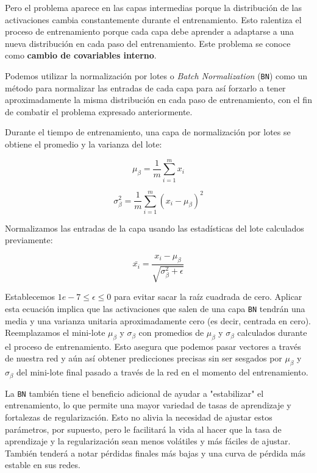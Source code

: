\documentclass[a4paper,12pt]{article}
\begin{document}
Pero el problema aparece en las capas intermedias porque la distribución de las activaciones cambia constantemente durante el entrenamiento. Esto ralentiza el proceso de entrenamiento porque cada capa debe aprender a adaptarse a una nueva distribución en cada paso del entrenamiento. Este problema se conoce como \textbf{cambio de covariables interno}.

Podemos utilizar la normalización por lotes o \textit{Batch Normalization} (\texttt{BN}) como un método para normalizar las entradas de cada capa para así forzarlo a tener aproximadamente la misma distribución en cada paso de entrenamiento, con el fin de combatir el problema expresado anteriormente.

Durante el tiempo de entrenamiento, una capa de normalización por lotes se obtiene el promedio y la varianza del lote:

$$ \mu_{\beta} = \frac{1}{m} \sum_{i=1}^m x_i $$

$$ \sigma_{\beta}^2 = \frac{1}{m}  \sum_{i=1}^m (x_i - \mu_{\beta} ) ^2$$

Normalizamos las entradas de la capa usando las estadísticas del lote calculados previamente:

$$ \bar{x_i} = \frac{x_i - \mu_{\beta}}{\sqrt{\sigma_{\beta}^2+\epsilon}} $$



Establecemos $1e-7 \leq \epsilon \leq 0$ para evitar sacar la raíz cuadrada de cero. Aplicar esta ecuación implica que las activaciones que salen de una capa \texttt{BN} tendrán una media y una varianza unitaria aproximadamente cero (es decir, centrada en cero).
Reemplazamos el mini-lote $\mu_{\beta}$ y $\sigma_{\beta}$ con promedios de $\mu_{\beta}$ y $\sigma_{\beta}$ calculados durante el proceso de entrenamiento. Esto asegura que podemos pasar vectores a través de nuestra red y aún así obtener predicciones precisas sin ser sesgados por $\mu_{\beta}$ y $\sigma_{\beta}$ del mini-lote final pasado a través de la red en el momento del entrenamiento. 

\clearpage

La \texttt{BN} también tiene el beneficio adicional de ayudar a "estabilizar" el entrenamiento, lo que permite una mayor variedad de tasas de aprendizaje y fortalezas de regularización. Esto no alivia la necesidad de ajustar estos parámetros, por supuesto, pero le facilitará la vida al hacer que la tasa de aprendizaje y la regularización sean menos volátiles y más fáciles de ajustar. También tenderá a notar pérdidas finales más bajas y una curva de pérdida más estable en sus redes.
\end{document}
